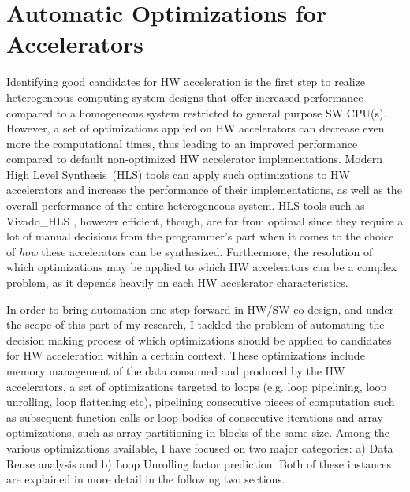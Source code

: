 \documentclass[]{usiinfthesis}
\newcommand{\HLS}{{High Level Synthesis}}
\begin{document}



%
%
%
%
%  
%
%
%
%
%

\chapter{Automatic Optimizations for Accelerators}

Identifying good candidates for HW acceleration is the first step to realize heterogeneous
computing system designs that offer increased performance compared to a homogeneous system restricted
to general purpose SW CPU(s). However, a set of optimizations applied on HW accelerators can decrease 
even more the computational times, thus leading to an improved performance compared to default
non-optimized HW accelerator implementations. 
Modern \HLS\ (HLS) tools can apply such optimizations to 
HW accelerators and increase the performance of their implementations, as well as the overall performance 
of the entire heterogeneous system.
HLS tools such as Vivado\_HLS  \cite{VivadoHLSMar17}, however efficient, though, are far from 
optimal since they require a lot of manual decisions from the programmer's part when it comes to the
choice of {\em how} these accelerators can be synthesized.
Furthermore, the resolution of which optimizations may be applied to which HW accelerators can be a 
complex problem, as it depends heavily on each HW accelerator characteristics.\par

In order to bring automation one step forward in HW/SW co-design, and under the scope of this part of my 
research, I tackled the problem of automating the decision making process of which optimizations should be 
applied to candidates for HW acceleration within a certain context. 
These optimizations include memory management of the data consumed and produced by the HW accelerators, 
a set of optimizations targeted to loops (e.g. loop pipelining, loop unrolling, loop flattening etc), 
pipelining consecutive pieces of computation such as subsequent function calls or loop bodies of consecutive 
iterations and array optimizations, such as array partitioning in blocks of the same size. Among the various 
optimizations available, I have focused on two major categories: a) Data Reuse analysis and b) Loop Unrolling 
factor prediction. Both of these instances are explained in more detail in the following two sections.
\end{document}
